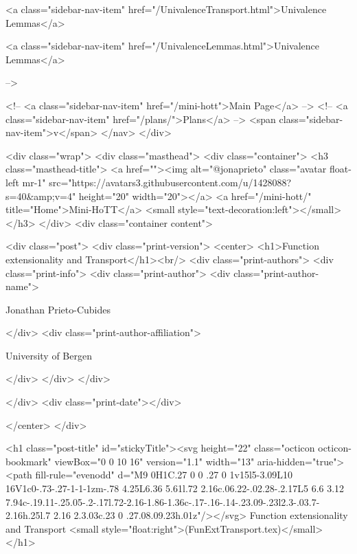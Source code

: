       
    
      
        
          <a class="sidebar-nav-item" href="/UnivalenceTransport.html">Univalence Lemmas</a>
        
      
    
      
        
          <a class="sidebar-nav-item" href="/UnivalenceLemmas.html">Univalence Lemmas</a>
        
      
     -->

    <!-- <a class="sidebar-nav-item" href="/mini-hott">Main Page</a> -->
    <!-- <a class="sidebar-nav-item" href="/plans/">Plans</a> -->
    <span class="sidebar-nav-item">v</span>
  </nav>
</div>

    <div class="wrap">
      <div class="masthead">
        <div class="container">
          <h3 class="masthead-title">
            <a href=""><img alt="@jonaprieto" class="avatar float-left mr-1" src="https://avatars3.githubusercontent.com/u/1428088?s=40&amp;v=4" height="20" width="20"></a>
            <a href="/mini-hott/" title="Home">Mini-HoTT</a>
            <small style="text-decoration:left"></small>
          </h3>
        </div>
      <div class="container content">
        







<div class="post">
  <div class="print-version">
    <center>
      <h1>Function extensionality and Transport</h1><br/>
        <div class="print-authors">
          <div class="print-info">
            <div class="print-author">
              <div class="print-author-name">
                
                  Jonathan Prieto-Cubides
                
              </div>
              <div class="print-author-affiliation">
                
                  University of Bergen
                
                </div>
            </div>
          </div>
          
          
        </div>
        <div class="print-date"></div>
        
        
    </center>
  </div>

  

  <h1 class="post-title" id="stickyTitle"><svg height="22" class="octicon octicon-bookmark" viewBox="0 0 10 16" version="1.1" width="13" aria-hidden="true"><path fill-rule="evenodd" d="M9 0H1C.27 0 0 .27 0 1v15l5-3.09L10 16V1c0-.73-.27-1-1-1zm-.78 4.25L6.36 5.61l.72 2.16c.06.22-.02.28-.2.17L5 6.6 3.12 7.94c-.19.11-.25.05-.2-.17l.72-2.16-1.86-1.36c-.17-.16-.14-.23.09-.23l2.3-.03.7-2.16h.25l.7 2.16 2.3.03c.23 0 .27.08.09.23h.01z"/></svg> Function extensionality and Transport <small style="float:right">(FunExtTransport.tex)</small>
  </h1>

